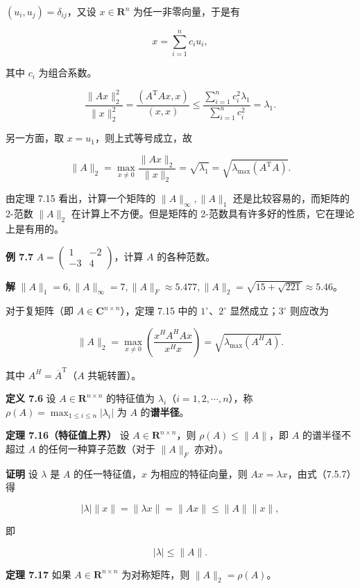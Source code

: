 \documentclass[
  10pt,
  fontset=fandol]{ctexart}
\begin{document}
\((u_i,u_j)=\delta_{ij}\)，又设 \(x\in\mathbf R^n\)
为任一非零向量，于是有

\[
x=\sum_{i=1}^{n}c_iu_i,
\]

其中 \(c_i\) 为组合系数。

\[
\frac{\|Ax\|_2^2}{\|x\|_2^2}
=\frac{(A^{\mathrm T}Ax,x)}{(x,x)}
\leqslant\frac{\sum_{i=1}^{n}c_i^2\lambda_1}{\sum_{i=1}^{n}c_i^2}=\lambda_1.
\]

另一方面，取 \(x=u_1\)，则上式等号成立，故

\[
\|A\|_2=\max_{x\neq0}\frac{\|Ax\|_2}{\|x\|_2}=\sqrt{\lambda_1}=\sqrt{\lambda_{\max}(A^{\mathrm T}A)}.
\]

由定理 7.15 看出，计算一个矩阵的 \(\|A\|_\infty,\|A\|_1\)
还是比较容易的，而矩阵的 2-范数 \(\|A\|_2\) 在计算上不方便。但是矩阵的
2-范数具有许多好的性质，它在理论上是有用的。

\textbf{例 7.7} \(A=\begin{pmatrix}1&-2\\-3&4\end{pmatrix}\)，计算 \(A\)
的各种范数。

\textbf{解}
\(\|A\|_1=6,\|A\|_\infty=7,\|A\|_F\approx5.477,\|A\|_2=\sqrt{15+\sqrt{221}}\approx5.46\)。

对于复矩阵（即 \(A\in\mathbf C^{n\times n}\)），定理 7.15 中的
\(1^\circ\)、\(2^\circ\) 显然成立；\(3^\circ\) 则应改为

\[
\|A\|_2=\max_{x\neq0}\left(\frac{x^HA^HAx}{x^Hx}\right)=\sqrt{\lambda_{\max}(A^HA)}.
\]

其中 \(A^H=\overline A^{\mathrm T}\)（\(A\) 共轭转置）。

\textbf{定义 7.6} 设 \(A\in\mathbf R^{n\times n}\) 的特征值为
\(\lambda_i\)（\(i=1,2,\cdots,n\)），称
\(\rho(A)=\max_{1\leqslant i\leqslant n}|\lambda_i|\) 为 \(A\)
的\textbf{谱半径}。

\textbf{定理 7.16（特征值上界）} 设 \(A\in\mathbf R^{n\times n}\)，则
\(\rho(A)\leqslant\|A\|\)，即 \(A\) 的谱半径不超过 \(A\)
的任何一种算子范数（对于 \(\|A\|_F\) 亦对）。

\textbf{证明} 设 \(\lambda\) 是 \(A\) 的任一特征值，\(x\)
为相应的特征向量，则 \(Ax=\lambda x\)，由式（7.5.7）得

\[
|\lambda|\|x\|=\|\lambda x\|=\|Ax\|\leqslant\|A\|\|x\|,
\]

即

\[
|\lambda|\leqslant\|A\|.
\]

\textbf{定理 7.17} 如果 \(A\in\mathbf R^{n\times n}\) 为对称矩阵，则
\(\|A\|_2=\rho(A)\)。
\end{document}
